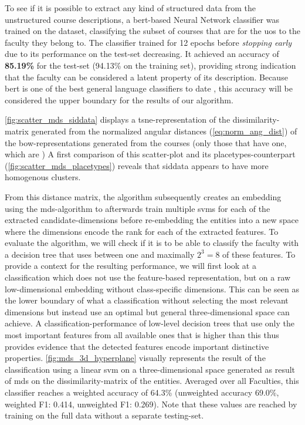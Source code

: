 To see if it is possible to extract any kind of structured data from the unstructured course descriptions, a \gls{bert}-based Neural Network classifier was trained on the dataset, classifying the subset of courses that are for the \gls{uos} to the faculty they belong to. The classifier trained for 12 epochs before \emph{stopping early} due to its performance on the test-set decreasing. It achieved an accuracy of \textbf{85.19\%} for the test-set (94.13\% on the training set), providing strong indication that the faculty can be considered a latent property of its description. Because \gls{bert} is one of the best general language classifiers to date \cite{Devlin2019}, this accuracy will be considered the upper boundary for the results of our algorithm.

\autoref{fig:scatter_mds_siddata} displays a \gls{tsne}-representation of the dissimilarity-matrix generated from the normalized angular distances (\autoref{eq:norm_ang_dist}) of the \gls{bow}-representations generated from the courses (only those that have one, which are ) A first comparison of this scatter-plot and its placetypes-counterpart (\autoref{fig:scatter_mds_placetypes}) reveals that siddata appears to have more homogenous clusters.

From this distance matrix, the algorithm subsequently creates an embedding using the \gls{mds}-algorithm to afterwards train multiple \glspl{svm} for each of the extracted candidate-dimensions before re-embedding the entities into a new space where the dimensions encode the \gls{rank} for each of the extracted features. To evaluate the algorithm, we will check if it is to be able to classify the faculty with a decision tree that uses between one and maximally $2^3=8$ of these features. To provide a context for the resulting performance, we will first look at a classification which does not use the feature-based representation, but on a raw low-dimensional embedding without class-specific dimensions. This can be seen as the lower boundary of what a classification without selecting the most relevant dimensions but instead use an optimal but general three-dimensional space can achieve. A classification-performance of low-level decision trees that use only the most important features from all available ones that is higher than this thus provides evidence that the detected features encode important distinctive properties. \autoref{fig:mds_3d_hyperplane} visually represents the result of the classification using a linear \gls{svm} on a three-dimensional space generated as result of \gls{mds} on the dissimilarity-matrix of the entities. Averaged over all Faculties, this classifier reaches a weighted accuracy of 64.3\% (unweighted accuracy 69.0\%, weighted F1: 0.414, unweighted F1: 0.269). Note that these values are reached by training on the full data without a separate testing-set.


